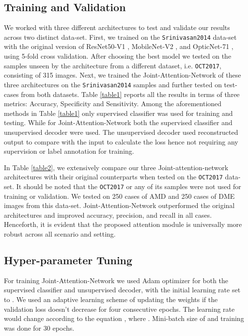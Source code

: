 \documentclass{article}
\begin{document}
\subsection{Training and Validation}
We worked with three different architectures to test and validate our results across two distinct data-set. First, we trained on the \texttt{Srinivasan2014} data-set with the original version of ResNet50-V1 \cite{he2016deep}, MobileNet-V2 \cite{sandler2018mobilenetv2}, and OpticNet-71 \cite{kamran2019optic}, using 5-fold cross validation. After choosing the best model we tested on the samples unseen by the architecture from a different dataset, i.e. \texttt{OCT2017}, consisting of 315 images. Next, we trained the Joint-Attention-Network of these three architectures on the \texttt{Srinivasan2014} samples and further tested on test-cases from both datasets. Table \ref{table1} reports all the results in terms of three metrics: Accuracy, Specificity and Sensitivity. Among the aforementioned methods in Table \ref{table1} only supervised classifier was used for training and testing. While for Joint-Attention-Network both the supervised classifier and unsupervised decoder were used. The unsupervised decoder used reconstructed output to compare with the input to calculate the loss hence not requiring any supervision or label annotation for training. 

In Table \ref{table2}, we extensively compare our three Joint-attention-network architectures with their original counterparts when tested on the \texttt{OCT2017} data-set. It should be noted that the \texttt{OCT2017} or any of its samples were not used for training or validation. We tested on 250 cases of AMD and 250 cases of DME images from this data-set. Joint-Attention-Network outperformed the original architectures and improved accuracy, precision, and recall in all cases. Henceforth, it is  evident that the proposed attention module is universally more robust across all scenario and setting. 

\subsection{Hyper-parameter Tuning}
For training Joint-Attention-Network we used Adam optimizer for both the supervised classifier and unsupervised decoder, with the initial learning rate set to  . We used an adaptive learning scheme of updating the weights if the validation loss doesn't decrease for four consecutive epochs. The learning rate would change according to the equation , where . Mini-batch size of  and training was done for 30 epochs.
\end{document}
